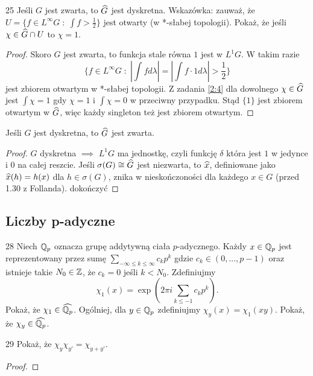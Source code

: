 \begin{zadanie}{2}{5}
  Jeśli $G$ jest zwarta, to $\Hat{G}$ jest dyskretna. Wskazówka: zauważ, że $U=\{f\in L^\infty G\;:\;\int f>\frac{1}{2}\}$ jest otwarty (w *-słabej topologii). Pokaż, że jeśli $\chi\in \Hat{G}\cap U$ to $\chi=1$.
\end{zadanie}

\begin{proof}
  Skoro $G$ jest zwarta, to funkcja stale równa $1$ jest w $L^1G$. W takim razie 
  $$\{f\in L^\infty G\;:\;\left|\int fd\lambda\right|=\left|\int f\cdot 1d\lambda\right|>\frac{1}{2}\}$$
  jest zbiorem otwartym w *-słabej topologii. Z zadania \ref{2:4} dla dowolnego $\chi \in \Hat{G}$ jest $\int \chi=1$ gdy $\chi=1$ i $\int\chi=0$ w przeciwny przypadku. Stąd $\{1\}$ jest zbiorem otwartym w $\Hat{G}$, więc każdy singleton też jest zbiorem otwartym.
\end{proof}

\begin{theorem}{}{}
  Jeśli $G$ jest dyskretna, to $\Hat{G}$ jest zwarta.
\end{theorem}

\begin{proof}
  $G$ dyskretna $\implies$ $L^1G$ ma jednostkę, czyli funkcję $\delta$ która jest $1$ w jedynce i $0$ na całej reszcie. Jeśli $\sigma(G)\cong \Hat{G}$ jest niezwarta, to $\Hat{x}$, definiowane jako $\Hat{x}(h)=h(x)$ dla $h\in\sigma(G)$, znika w nieskończoności dla każdego $x\in G$ (przed 1.30 z Follanda). {\color{red}dokończyć}
\end{proof}

\subsection{Liczby p-adyczne}

\begin{zadanie}{2}{8}
  Niech $\Q_p$ oznacza grupę addytywną ciała $p$-adycznego. Każdy $x\in\Q_p$ jest reprezentowany przez sumę $\sum_{-\infty \leq k\leq \infty} c_kp^k$ gdzie $c_k\in (0,...,p-1)$ oraz istnieje takie $N_0\in\Z$, że $c_k=0$ jeśli $k<N_0$. Zdefiniujmy 
  $$\chi_1(x)=\exp\left(2\pi i\sum_{k\leq -1} c_kp^k\right).$$
  Pokaż, że $\chi_1\in\Hat{\Q_p}$. Ogólniej, dla $y\in\Q_p$ zdefiniujmy $\chi_y(x)=\chi_1(xy)$. Pokaż, że $\chi_y\in\Hat{\Q_p}$.
\end{zadanie}

\begin{zadanie}{2}{9}
  Pokaż, że $\chi_y\chi_{y'}=\chi_{y+y'}$.
\end{zadanie}

\begin{proof}
\end{proof}













